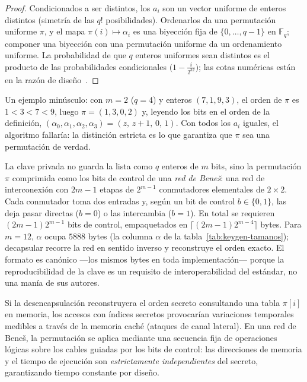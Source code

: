 \documentclass[11pt,a4paper,oneside]{report}
\newcommand{\GF}[1]{\mathbb{F}_{#1}}
\begin{document}
\begin{proof}
Condicionados a ser distintos, los $a_i$ son un vector uniforme de
enteros distintos (simetría de las $q!$ posibilidades). Ordenarlos da
una permutación uniforme $\pi$, y el mapa $\pi(i)\mapsto\alpha_i$ es una
biyección fija de $\{0,\dots,q-1\}$ en $\GF q$; componer una biyección
con una permutación uniforme da un ordenamiento uniforme. La
probabilidad de que $q$ enteros uniformes sean distintos es el producto
de las probabilidades condicionales $\bigl(1-\tfrac{i}{2^{32}}\bigr)$;
las cotas numéricas están en la razón de
diseño~\cite{cmrationale}.
\end{proof}

Un ejemplo minúsculo: con $m=2$ ($q=4$) y enteros $(7,1,9,3)$, el orden
de $\pi$ es $1<3<7<9$, luego $\pi=(1,3,0,2)$ y, leyendo los bits en el
orden de la definición, $(\alpha_0,\alpha_1,\alpha_2,\alpha_3)
=(z,\,z+1,\,0,\,1)$. Con todos los $a_i$ iguales, el algoritmo fallaría:
la distinción estricta es lo que garantiza que $\pi$ sea una permutación
de verdad.

La clave privada no guarda la lista como $q$ enteros de $m$ bits, sino
la permutación $\pi$ comprimida como los bits de control de una
\emph{red de Beneš}: una red de interconexión con $2m-1$ etapas de $2^{m-1}$
conmutadores elementales de $2\times2$. Cada conmutador toma dos entradas y,
según un bit de control $b\in\{0,1\}$, las deja pasar directas ($b=0$) o las
intercambia ($b=1$). En total se requieren $(2m-1)2^{m-1}$ bits de control,
empaquetados en $\lceil(2m-1)2^{m-4}\rceil$ bytes. Para $m=12$, $\alpha$ ocupa
$5888$ bytes (la columna $\alpha$ de la tabla~\ref{tab:keygen-tamanos});
decapsular recorre la red en sentido inverso y reconstruye el orden
exacto. El formato es canónico ---los mismos bytes en toda
implementación--- porque la reproducibilidad de la clave es un
requisito de interoperabilidad del estándar, no una manía de sus
autores.
\label{sec:benes}

\begin{idea}
Si la desencapsulación reconstruyera el orden secreto consultando una tabla
$\pi[i]$ en memoria, los accesos con índices secretos provocarían variaciones
temporales medibles a través de la memoria caché (ataques de canal lateral).
En una red de Beneš, la permutación se aplica mediante una secuencia fija de
operaciones lógicas sobre los cables guiadas por los bits de control: las
direcciones de memoria y el tiempo de ejecución son \emph{estrictamente independientes}
del secreto, garantizando tiempo constante por diseño.
\end{idea}
\end{document}
